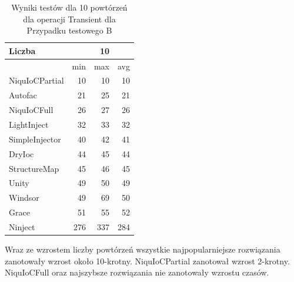 \documentclass[12pt]{article}
\begin{document}
\begin{table}[H]
\captionsetup{belowskip=0pt,aboveskip=0pt}
\begin{center}
\begin{small}
	\begin{tabular}{ | l | r r r | }
    		\hline
Liczba & & 10 & \\ \hline
 & min & max & avg \\ \hline
NiquIoCPartial & 10 & 10 & 10 \\ \hline
Autofac & 21 & 25 & 21 \\ \hline
NiquIoCFull & 26 & 27 & 26 \\ \hline
LightInject & 32 & 33 & 32 \\ \hline
SimpleInjector & 40 & 42 & 41 \\ \hline
DryIoc & 44 & 45 & 44 \\ \hline
StructureMap & 45 & 46 & 45 \\ \hline
Unity & 49 & 50 & 49 \\ \hline
Windsor & 49 & 69 & 50 \\ \hline
Grace & 51 & 55 & 52 \\ \hline
Ninject & 276 & 337 & 284 \\ \hline
  	\end{tabular}
\end{small}
\end{center}
\caption{Wyniki testów dla 10 powtórzeń dla operacji Transient dla Przypadku testowego B}
\label{TestCaseB_Transient10}
\end{table}
Wraz ze wzrostem liczby powtórzeń wszystkie najpopularniejsze rozwiązania zanotowały wzrost około 10-krotny. NiquIoCPartial zanotował wzrost 2-krotny. NiquIoCFull oraz najszybsze rozwiązania nie zanotowały wzrostu czasów.
\\ \\
\end{document}
